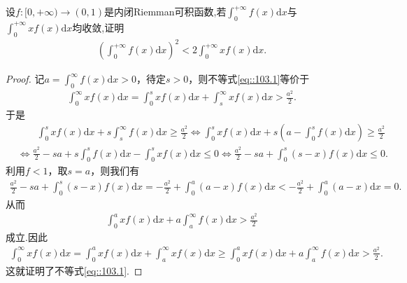 \documentclass[../../main.tex]{subfiles}
\begin{document}
\begin{example}
设$f:[0,+\infty)\to (0,1)$是内闭Riemman可积函数,若$\int_0^{+\infty} f(x) \mathrm{d}x$与$\int_0^{+\infty} x f(x) \mathrm{d}x$均收敛,证明
\begin{align}
\left( \int_0^{+\infty} f(x) \mathrm{d}x \right)^2 < 2 \int_0^{+\infty} x f(x) \mathrm{d}x.\label{eq::103.1}
\end{align}
\end{example}
\begin{proof}
记$a=\int_0^{\infty} f(x) \mathrm{d}x>0$，待定$s>0$，则不等式\eqref{eq::103.1}等价于
\begin{align*}
\int_0^{\infty} x f(x) \mathrm{d}x = \int_0^s x f(x) \mathrm{d}x + \int_s^{\infty} x f(x) \mathrm{d}x > \frac{a^2}{2}.
\end{align*}
于是
\begin{align*}
&\quad \quad \int_0^s x f(x) \mathrm{d}x + s \int_s^{\infty} f(x) \mathrm{d}x \geqslant \frac{a^2}{2} \Longleftrightarrow \int_0^s x f(x) \mathrm{d}x + s \left( a - \int_0^s f(x) \mathrm{d}x \right) \geqslant \frac{a^2}{2} \\
&\Longleftrightarrow \frac{a^2}{2} - sa + s \int_0^s f(x) \mathrm{d}x - \int_0^s x f(x) \mathrm{d}x \leqslant 0 \Longleftrightarrow \frac{a^2}{2} - sa + \int_0^s (s - x) f(x) \mathrm{d}x \leqslant 0.
\end{align*}
利用$f<1$，取$s=a$，则我们有
\begin{align*}
\frac{a^2}{2} - sa + \int_0^s (s - x) f(x) \mathrm{d}x = -\frac{a^2}{2} + \int_0^a (a - x) f(x) \mathrm{d}x < -\frac{a^2}{2} + \int_0^a (a - x) \mathrm{d}x = 0.
\end{align*}
从而
\begin{align*}
\int_0^a x f(x) \mathrm{d}x + a \int_a^{\infty} f(x) \mathrm{d}x > \frac{a^2}{2}
\end{align*}
成立.因此
\begin{align*}
\int_0^{\infty} x f(x) \mathrm{d}x = \int_0^a x f(x) \mathrm{d}x + \int_a^{\infty} x f(x) \mathrm{d}x \geqslant \int_0^a x f(x) \mathrm{d}x + a \int_a^{\infty} f(x) \mathrm{d}x > \frac{a^2}{2}.
\end{align*}
这就证明了不等式\eqref{eq::103.1}.
\end{proof}
\end{document}
